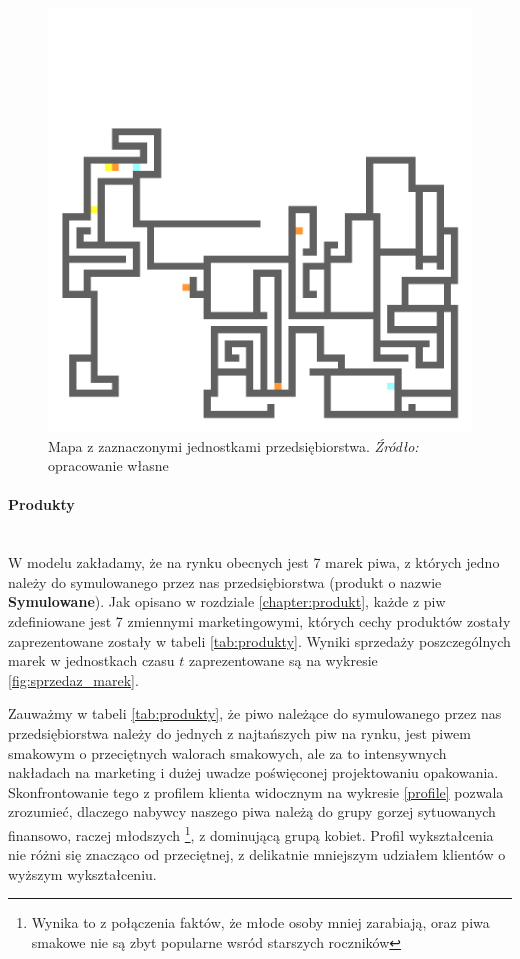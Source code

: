 \documentclass[polish, twoside, 12pt, a4paper]{article}
\theoremstyle{definition}
\theoremstyle{plain}
\theoremstyle{remark}
\begin{document}
\begin{figure}[hbt]
  \centering
    \includegraphics[width=\textwidth]{../mapy/firma.png}
  \captionsetup{margin=10pt,font=small,labelfont=bf,width=.8\textwidth}
  \caption[Krótka nazwa X]{Mapa z zaznaczonymi jednostkami przedsiębiorstwa. \textit{Źródło:} opracowanie własne}\label{mapafirma}
\end{figure}

\paragraph{Produkty}\mbox{}\\
W modelu zakładamy, że na rynku obecnych jest 7 marek piwa, z których jedno należy do symulowanego przez nas przedsiębiorstwa (produkt o nazwie \textbf{Symulowane}). Jak opisano w rozdziale \ref{chapter:produkt}, każde z piw zdefiniowane jest 7 zmiennymi marketingowymi, których cechy produktów zostały zaprezentowane zostały w tabeli \ref{tab:produkty}. Wyniki sprzedaży poszczególnych marek w jednostkach czasu $t$ zaprezentowane są na wykresie \ref{fig:sprzedaz_marek}.

Zauważmy w tabeli \ref{tab:produkty}, że piwo należące do symulowanego przez nas przedsiębiorstwa należy do jednych z najtańszych piw na rynku, jest piwem smakowym o przeciętnych walorach smakowych, ale za to intensywnych nakładach na marketing i dużej uwadze poświęconej projektowaniu opakowania. Skonfrontowanie tego z profilem klienta widocznym na wykresie \ref{profile} pozwala zrozumieć, dlaczego nabywcy naszego piwa należą do grupy gorzej sytuowanych finansowo, raczej młodszych \footnote{Wynika to z połączenia faktów, że młode osoby mniej zarabiają, oraz piwa smakowe nie są zbyt popularne wsród starszych roczników}, z dominującą grupą kobiet. Profil wykształcenia nie różni się znacząco od przeciętnej, z delikatnie mniejszym udziałem klientów o wyższym wykształceniu.
\end{document}
